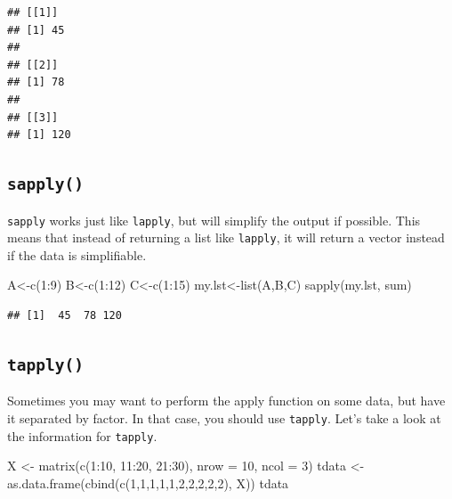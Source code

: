 \documentclass[
]{book}
\newenvironment{Shaded}{\begin{snugshade}}{\end{snugshade}}
\newcommand{\AttributeTok}[1]{\textcolor[rgb]{0.77,0.63,0.00}{#1}}
\newcommand{\DecValTok}[1]{\textcolor[rgb]{0.00,0.00,0.81}{#1}}
\newcommand{\FunctionTok}[1]{\textcolor[rgb]{0.00,0.00,0.00}{#1}}
\newcommand{\NormalTok}[1]{#1}
\newcommand{\OtherTok}[1]{\textcolor[rgb]{0.56,0.35,0.01}{#1}}
\newcommand{\SpecialCharTok}[1]{\textcolor[rgb]{0.00,0.00,0.00}{#1}}
\begin{document}
\begin{verbatim}
## [[1]]
## [1] 45
## 
## [[2]]
## [1] 78
## 
## [[3]]
## [1] 120
\end{verbatim}

\hypertarget{sapply}{%
\subsection{\texorpdfstring{\texttt{sapply()}}{sapply()}}\label{sapply}}

\texttt{sapply} works just like \texttt{lapply}, but will simplify the output if possible. This means that instead of returning a list like \texttt{lapply}, it will return a vector instead if the data is simplifiable.

\begin{Shaded}
\begin{Highlighting}[]
\NormalTok{A}\OtherTok{\textless{}{-}}\FunctionTok{c}\NormalTok{(}\DecValTok{1}\SpecialCharTok{:}\DecValTok{9}\NormalTok{)}
\NormalTok{B}\OtherTok{\textless{}{-}}\FunctionTok{c}\NormalTok{(}\DecValTok{1}\SpecialCharTok{:}\DecValTok{12}\NormalTok{)}
\NormalTok{C}\OtherTok{\textless{}{-}}\FunctionTok{c}\NormalTok{(}\DecValTok{1}\SpecialCharTok{:}\DecValTok{15}\NormalTok{)}
\NormalTok{my.lst}\OtherTok{\textless{}{-}}\FunctionTok{list}\NormalTok{(A,B,C)}
\FunctionTok{sapply}\NormalTok{(my.lst, sum)}
\end{Highlighting}
\end{Shaded}

\begin{verbatim}
## [1]  45  78 120
\end{verbatim}

\hypertarget{tapply}{%
\subsection{\texorpdfstring{\texttt{tapply()}}{tapply()}}\label{tapply}}

Sometimes you may want to perform the apply function on some data, but have it separated by factor. In that case, you should use \texttt{tapply}. Let's take a look at the information for \texttt{tapply}.

\begin{Shaded}
\begin{Highlighting}[]
\NormalTok{X }\OtherTok{\textless{}{-}} \FunctionTok{matrix}\NormalTok{(}\FunctionTok{c}\NormalTok{(}\DecValTok{1}\SpecialCharTok{:}\DecValTok{10}\NormalTok{, }\DecValTok{11}\SpecialCharTok{:}\DecValTok{20}\NormalTok{, }\DecValTok{21}\SpecialCharTok{:}\DecValTok{30}\NormalTok{), }\AttributeTok{nrow =} \DecValTok{10}\NormalTok{, }\AttributeTok{ncol =} \DecValTok{3}\NormalTok{)}
\NormalTok{tdata }\OtherTok{\textless{}{-}} \FunctionTok{as.data.frame}\NormalTok{(}\FunctionTok{cbind}\NormalTok{(}\FunctionTok{c}\NormalTok{(}\DecValTok{1}\NormalTok{,}\DecValTok{1}\NormalTok{,}\DecValTok{1}\NormalTok{,}\DecValTok{1}\NormalTok{,}\DecValTok{1}\NormalTok{,}\DecValTok{2}\NormalTok{,}\DecValTok{2}\NormalTok{,}\DecValTok{2}\NormalTok{,}\DecValTok{2}\NormalTok{,}\DecValTok{2}\NormalTok{), X))}
\NormalTok{tdata}
\end{Highlighting}
\end{Shaded}
\end{document}
